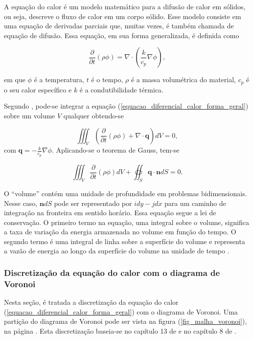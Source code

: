 A equação do calor é um modelo matemático para a difusão de calor em sólidos, ou seja, descreve o fluxo de calor em um corpo sólido. Esse modelo consiste em uma equação de derivadas parciais que, muitas vezes, é também chamada de equação de difusão. Essa equação, em sua forma generalizada, é definida como

\begin{equation}
\frac {\partial } {\partial t} (\rho \phi)  =  \nabla \cdot \left( \frac {k} {c_{p}} \nabla \phi \right) ,
\label{equacao_diferencial_calor_forma_geral}
\end{equation}

\noindent em que $\phi$ é a temperatura, $t$ é o tempo, $\rho$ é a massa volumétrica do material, $c_{p}$ é o seu calor específico e $k$ é a condutibilidade térmica. 

Segundo , pode-se integrar a equação (\ref{equacao_diferencial_calor_forma_geral}) sobre um volume $V$ qualquer obtendo-se

\[
\iiint_V  \left ( \frac {\partial } {\partial t} (\rho \phi)  +  \nabla \cdot {\mathbf q} \right )dV = 0,
\]
\noindent com ${\mathbf q} =  - \frac {k} {c_{p}} \nabla \phi$. Aplicando-se o teorema de Gauss, tem-se

\[
 \iiint _{V}   \frac {\partial } {\partial t} (\rho \phi) dV  +   \oiint_{S} {\mathbf q} \cdot {\mathbf n}  dS = 0.
\]

O ``volume'' contém uma unidade de profundidade em problemas bidimensionais. Nesse caso, ${\mathbf n} dS$ pode ser representado por $i dy - j dx$ para um caminho de integração na fronteira em sentido horário. Essa equação segue a lei de conservação. O primeiro termo na equação, uma integral sobre o volume, significa a taxa de variação da energia armazenada no volume em função do tempo. O segundo termo é uma integral de linha sobre a superfície do volume e representa a vazão de energia ao longo da superfície do volume na unidade de tempo \cite[p. 72 - 76]{Tannehill1997}. 

\subsubsection {Discretização da equação do calor com o diagrama de Voronoi}\label{cap_discretizacao_malha_irregular}

Nesta seção, é tratada a  discretização da equação do calor (\ref{equacao_diferencial_calor_forma_geral}) com o diagrama de Voronoi. Uma partição do diagrama de Voronoi pode ser vista na figura (\ref{fig_malha_voronoi}), na página \pageref{fig_malha_voronoi}. Esta discretização baseia-se no capítulo 13 de  e no capítulo 8 de .

